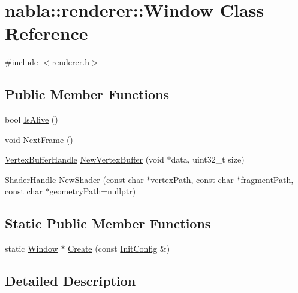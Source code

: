 \hypertarget{classnabla_1_1renderer_1_1_window}{}\section{nabla\+::renderer\+::Window Class Reference}
\label{classnabla_1_1renderer_1_1_window}


{\ttfamily \#include $<$renderer.\+h$>$}

\subsection*{Public Member Functions}
\begin{DoxyCompactItemize}
\item 
bool \mbox{\hyperlink{classnabla_1_1renderer_1_1_window_aac292b20dba6d005eebf0da33048e005}{Is\+Alive}} ()
\item 
void \mbox{\hyperlink{classnabla_1_1renderer_1_1_window_ae1f5cf28387cf2ed2501d845ddb54818}{Next\+Frame}} ()
\item 
\mbox{\hyperlink{namespacenabla_1_1renderer_aa901f31283abb372f2a5ca3b90e09f54}{Vertex\+Buffer\+Handle}} \mbox{\hyperlink{classnabla_1_1renderer_1_1_window_abff185d5dd091f47bdc71d134e5b006a}{New\+Vertex\+Buffer}} (void $\ast$data, uint32\+\_\+t size)
\item 
\mbox{\hyperlink{namespacenabla_1_1renderer_a351c881c3df21186064938743d67dd85}{Shader\+Handle}} \mbox{\hyperlink{classnabla_1_1renderer_1_1_window_aa1368ed98f5ebd2fd111ce0c7e400e5a}{New\+Shader}} (const char $\ast$vertex\+Path, const char $\ast$fragment\+Path, const char $\ast$geometry\+Path=nullptr)
\end{DoxyCompactItemize}
\subsection*{Static Public Member Functions}
\begin{DoxyCompactItemize}
\item 
static \mbox{\hyperlink{classnabla_1_1renderer_1_1_window}{Window}} $\ast$ \mbox{\hyperlink{classnabla_1_1renderer_1_1_window_acc4b55396a6ccf3d57abfc844f492323}{Create}} (const \mbox{\hyperlink{structnabla_1_1renderer_1_1_init_config}{Init\+Config}} \&)
\end{DoxyCompactItemize}


\subsection{Detailed Description}


